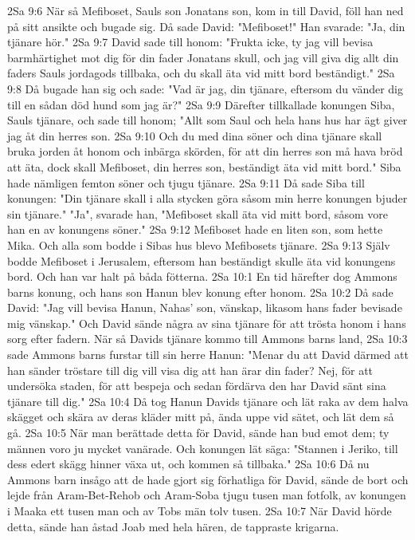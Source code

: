 2Sa 9:6  När så Mefiboset, Sauls son Jonatans son, kom in till David, föll han ned på sitt ansikte och bugade sig. Då sade David: "Mefiboset!" Han svarade: "Ja, din tjänare hör."
2Sa 9:7  David sade till honom: "Frukta icke, ty jag vill bevisa barmhärtighet mot dig för din fader Jonatans skull, och jag vill giva dig allt din faders Sauls jordagods tillbaka, och du skall äta vid mitt bord beständigt."
2Sa 9:8  Då bugade han sig och sade: "Vad är jag, din tjänare, eftersom du vänder dig till en sådan död hund som jag är?"
2Sa 9:9  Därefter tillkallade konungen Siba, Sauls tjänare, och sade till honom; "Allt som Saul och hela hans hus har ägt giver jag åt din herres son.
2Sa 9:10  Och du med dina söner och dina tjänare skall bruka jorden åt honom och inbärga skörden, för att din herres son må hava bröd att äta, dock skall Mefiboset, din herres son, beständigt äta vid mitt bord." Siba hade nämligen femton söner och tjugu tjänare.
2Sa 9:11  Då sade Siba till konungen: "Din tjänare skall i alla stycken göra såsom min herre konungen bjuder sin tjänare." "Ja", svarade han, "Mefiboset skall äta vid mitt bord, såsom vore han en av konungens söner."
2Sa 9:12  Mefiboset hade en liten son, som hette Mika. Och alla som bodde i Sibas hus blevo Mefibosets tjänare.
2Sa 9:13  Själv bodde Mefiboset i Jerusalem, eftersom han beständigt skulle äta vid konungens bord. Och han var halt på båda fötterna.
2Sa 10:1  En tid härefter dog Ammons barns konung, och hans son Hanun blev konung efter honom.
2Sa 10:2  Då sade David: "Jag vill bevisa Hanun, Nahas' son, vänskap, likasom hans fader bevisade mig vänskap." Och David sände några av sina tjänare för att trösta honom i hans sorg efter fadern. När så Davids tjänare kommo till Ammons barns land,
2Sa 10:3  sade Ammons barns furstar till sin herre Hanun: "Menar du att David därmed att han sänder tröstare till dig vill visa dig att han ärar din fader? Nej, för att undersöka staden, för att bespeja och sedan fördärva den har David sänt sina tjänare till dig."
2Sa 10:4  Då tog Hanun Davids tjänare och lät raka av dem halva skägget och skära av deras kläder mitt på, ända uppe vid sätet, och lät dem så gå.
2Sa 10:5  När man berättade detta för David, sände han bud emot dem; ty männen voro ju mycket vanärade. Och konungen lät säga: "Stannen i Jeriko, till dess edert skägg hinner växa ut, och kommen så tillbaka."
2Sa 10:6  Då nu Ammons barn insågo att de hade gjort sig förhatliga för David, sände de bort och lejde från Aram-Bet-Rehob och Aram-Soba tjugu tusen man fotfolk, av konungen i Maaka ett tusen man och av Tobs män tolv tusen.
2Sa 10:7  När David hörde detta, sände han åstad Joab med hela hären, de tappraste krigarna.
